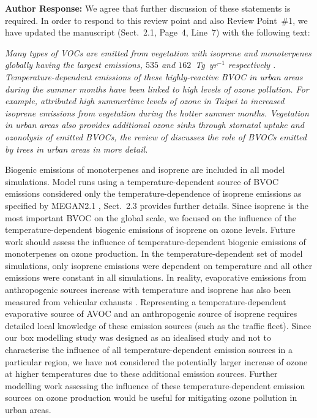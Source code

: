 \documentclass{article}
\begin{document}
\textbf{Author Response:} We agree that further discussion of these statements is required. In order to respond to this review point and also Review Point~\#1, we have updated the manuscript (Sect.~2.1, Page~4, Line~7) with the following text:
{\itshape
Many types of VOCs are emitted from vegetation with isoprene and monoterpenes globally having the largest emissions, $535$ and $162$~Tg~yr$^{-1}$ respectively \citep{Guenther:2012}.
Temperature-dependent emissions of these highly-reactive BVOC in urban areas during the summer months have been linked to high levels of ozone pollution.
For example, \citet{Wang:2013} attributed high summertime levels of ozone in Taipei to increased isoprene emissions from vegetation during the hotter summer months.
Vegetation in urban areas also provides additional ozone sinks through stomatal uptake and ozonolysis of emitted BVOCs, the review of \citet{Calfapietra:2013} discusses the role of BVOCs emitted by trees in urban areas in more detail.

Biogenic emissions of monoterpenes and isoprene are included in all model simulations. 
Model runs using a temperature-dependent source of BVOC emissions considered only the temperature-dependence of isoprene emissions as specified by MEGAN2.1 \citep{Guenther:2012}, Sect.~2.3 provides further details. 
Since isoprene is the most important BVOC on the global scale, we focused on the influence of the temperature-dependent biogenic emissions of isoprene on ozone levels.
Future work should assess the influence of temperature-dependent biogenic emissions of monoterpenes on ozone production.
In the temperature-dependent set of model simulations, only isoprene emissions were dependent on temperature and all other emissions were constant in all simulations.
In reality, evaporative emissions from anthropogenic sources increase with temperature \citep{Rubin:2006} and isoprene has also been measured from vehicular exhausts \citep{Borbon:2001}.
Representing a temperature-dependent evaporative source of AVOC and an anthropogenic source of isoprene requires detailed local knowledge of these emission sources (such as the traffic fleet).
Since our box modelling study was designed as an idealised study and not to characterise the influence of all temperature-dependent emission sources in a particular region, we have not considered the potentially larger increase of ozone at higher temperatures due to these additional emission sources.
Further modelling work assessing the influence of these temperature-dependent emission sources on ozone production would be useful for mitigating ozone pollution in urban areas.
}
\end{document}
